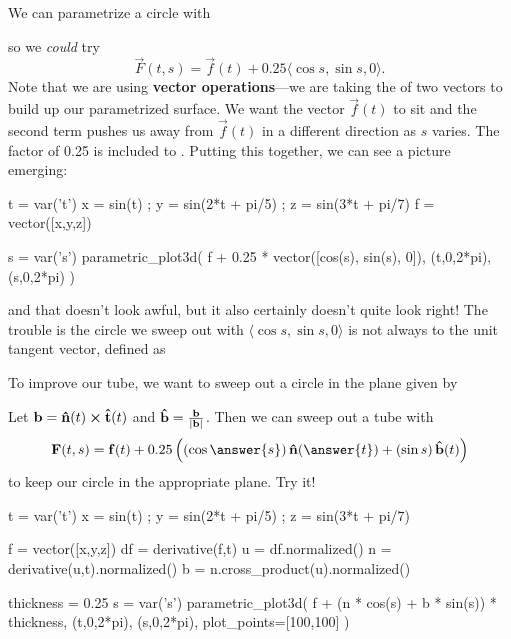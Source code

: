 \documentclass{ximera}
\begin{document}
\begin{example}
  We can parametrize a circle with
  \begin{multipleChoice}
  \end{multipleChoice}
  so we \textit{could} try
  \[
    \vec{F}(t,s) = \vec{f}(t) + 0.25 \langle \cos s, \sin s, 0 \rangle.
  \]
  Note that we are using \textbf{vector operations}---we are taking the
 of two vectors to build up our parametrized surface.  We want the vector $\vec{f}(t)$ to sit  and the second term pushes us away from $\vec{f}(t)$ in a different direction as $s$ varies.  The factor of 0.25 is included to .  Putting this together, we can see a picture emerging:
  \begin{sageCell}
t = var('t')
x = sin(t) ; y = sin(2*t + pi/5) ; z = sin(3*t + pi/7)
f = vector([x,y,z])

s = var('s')
parametric_plot3d( f + 0.25 * vector([cos(s), sin(s), 0]), (t,0,2*pi), (s,0,2*pi) )
\end{sageCell}
and that doesn't look awful, but it also certainly doesn't quite look
right!  The trouble is the circle we sweep out with
$\langle \cos s, \sin s, 0 \rangle$ is not always
 to the
unit tangent vector, defined as
\begin{multipleChoice}
\end{multipleChoice}
To improve our tube, we want to sweep out a circle in the plane given by
\begin{multipleChoice}
\end{multipleChoice}
Let $\mathbf{b} = \mathbf{\hat{n}}(t) \boldsymbol\times \mathbf{\hat{t}}(t)$ and $\mathbf{\hat{b}} = \frac{\mathbf{b}}{| \mathbf{b} |}$.  Then we can sweep out a tube with
  \[
    \vec{F}(t,s) = \vec{f}(t) + 0.25 \left( \left( \cos \answer{s} \right) \unormal(\answer{t}) + \left( \sin s \right) \ubinormal(t) \right)
  \]
  to keep our circle in the appropriate plane.  Try it!
\begin{sageCell}
t = var('t')
x = sin(t) ; y = sin(2*t + pi/5) ; z = sin(3*t + pi/7)

f = vector([x,y,z])
df = derivative(f,t)
u = df.normalized()
n = derivative(u,t).normalized()
b = n.cross_product(u).normalized()

thickness = 0.25
s = var('s')
parametric_plot3d( f + (n * cos(s) + b * sin(s)) * thickness, (t,0,2*pi), (s,0,2*pi), plot_points=[100,100] )
\end{sageCell}
\end{example}  
\end{document}

